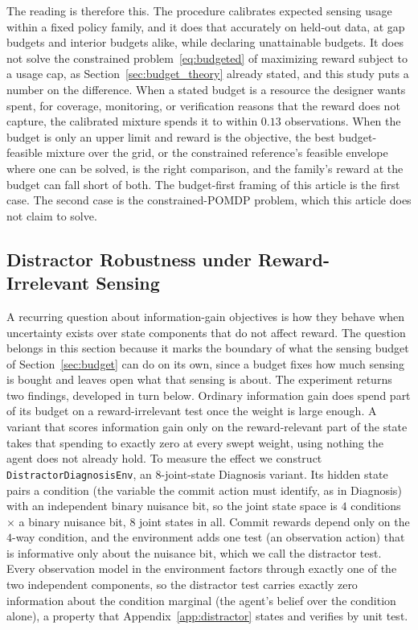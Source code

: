The reading is therefore this. The procedure calibrates expected sensing usage within a fixed policy family, and it does that accurately on held-out data, at gap budgets and interior budgets alike, while declaring unattainable budgets. It does not solve the constrained problem~\eqref{eq:budgeted} of maximizing reward subject to a usage cap, as Section~\ref{sec:budget_theory} already stated, and this study puts a number on the difference. When a stated budget is a resource the designer wants spent, for coverage, monitoring, or verification reasons that the reward does not capture, the calibrated mixture spends it to within $0.13$ observations. When the budget is only an upper limit and reward is the objective, the best budget-feasible mixture over the grid, or the constrained reference's feasible envelope where one can be solved, is the right comparison, and the family's reward at the budget can fall short of both. The budget-first framing of this article is the first case. The second case is the constrained-POMDP problem, which this article does not claim to solve.



\subsection{Distractor Robustness under Reward-Irrelevant Sensing}
\label{app:distractor_details}

A recurring question about information-gain objectives is how they behave when uncertainty exists over state components that do not affect reward. The question belongs in this section because it marks the boundary of what the sensing budget of Section~\ref{sec:budget} can do on its own, since a budget fixes how much sensing is bought and leaves open what that sensing is about. The experiment returns two findings, developed in turn below. Ordinary information gain does spend part of its budget on a reward-irrelevant test once the weight is large enough. A variant that scores information gain only on the reward-relevant part of the state takes that spending to exactly zero at every swept weight, using nothing the agent does not already hold. To measure the effect we construct \texttt{DistractorDiagnosisEnv}, an $8$-joint-state Diagnosis variant. Its hidden state pairs a condition (the variable the commit action must identify, as in Diagnosis) with an independent binary nuisance bit, so the joint state space is $4$ conditions $\times$ a binary nuisance bit, $8$ joint states in all. Commit rewards depend only on the $4$-way condition, and the environment adds one test (an observation action) that is informative only about the nuisance bit, which we call the distractor test. Every observation model in the environment factors through exactly one of the two independent components, so the distractor test carries exactly zero information about the condition marginal (the agent's belief over the condition alone), a property that Appendix~\ref{app:distractor} states and verifies by unit test.

